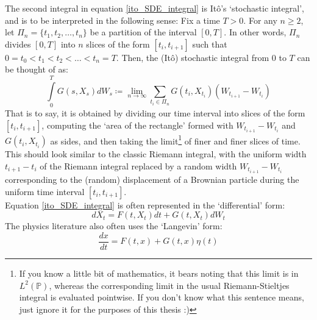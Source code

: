 The second integral in equation \eqref{ito_SDE_integral} is It\^o's `stochastic integral', and is to be interpreted in the following sense: Fix a time $T > 0$. For any $n\geq2$, let $\Pi_n = \{t_1,t_2,\ldots,t_n\}$ be a partition of the interval $[0,T]$. In other words, $\Pi_n$ divides $[0,T]$ into $n$ slices of the form $[t_i,t_{i+1}]$ such that $0 = t_0 < t_1 < t_2 < \ldots < t_n = T$. Then, the (It\^o) stochastic integral from $0$ to $T$ can be thought of as:
\begin{equation*}
\int\limits_{0}^{T} G(s,X_s)dW_s \coloneqq \lim_{n \to \infty} \sum\limits_{t_i \in \Pi_n}G(t_i,X_{t_i})(W_{t_{i+1}}-W_{t_i})  
\end{equation*}
That is to say, it is obtained by dividing our time interval into slices of the form $[t_i,t_{i+1}]$, computing the `area of the rectangle' formed with $W_{t_{i+1}}-W_{t_i}$ and $G(t_i,X_{t_i})$ as sides, and then taking the limit\footnote{If you know a little bit of mathematics, it bears noting that this limit is in $L^2(\mathbb{P})$, whereas the corresponding limit in the usual Riemann-Stieltjes integral is evaluated pointwise. If you don't know what this sentence means, just ignore it for the purposes of this thesis :)} of finer and finer slices of time. This should look similar to the classic Riemann integral, with the uniform width $t_{i+1}-t_i$ of the Riemann integral replaced by a random width $W_{t_{i+1}}-W_{t_i}$ corresponding to the (random) displacement of a Brownian particle during the uniform time interval $[t_i,t_{i+1}]$.\\
Equation \eqref{ito_SDE_integral} is often represented in the `differential' form:
\begin{equation}
\label{ito_SDE_diff}
dX_t = F(t,X_t)dt + G(t,X_t)dW_t
\end{equation}
The physics literature also often uses the `Langevin' form:
\begin{equation}
\label{ito_langevin}
\frac{dx}{dt} = F(t,x) + G(t,x)\eta(t)
\end{equation}
